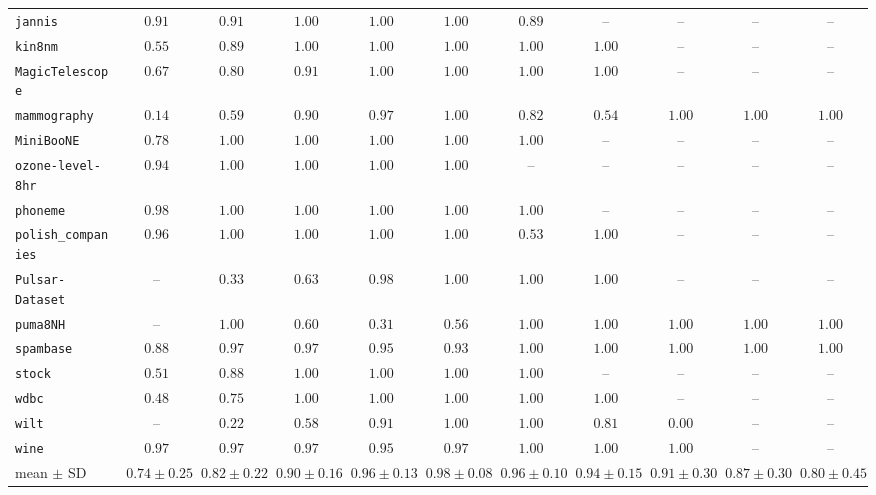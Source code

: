{\begin{tabular}{@{}lcccccccccc@{}}
\texttt{jannis} & $0.91$ & $0.91$ & $1.00$ & $1.00$ & $1.00$ & $0.89$ & -- & -- & -- & -- \\
\texttt{kin8nm} & $0.55$ & $0.89$ & $1.00$ & $1.00$ & $1.00$ & $1.00$ & $1.00$ & -- & -- & -- \\
\texttt{MagicTelescope} & $0.67$ & $0.80$ & $0.91$ & $1.00$ & $1.00$ & $1.00$ & $1.00$ & -- & -- & -- \\
\texttt{mammography} & $0.14$ & $0.59$ & $0.90$ & $0.97$ & $1.00$ & $0.82$ & $0.54$ & $1.00$ & $1.00$ & $1.00$ \\
\texttt{MiniBooNE} & $0.78$ & $1.00$ & $1.00$ & $1.00$ & $1.00$ & $1.00$ & -- & -- & -- & -- \\
\texttt{ozone-level-8hr} & $0.94$ & $1.00$ & $1.00$ & $1.00$ & $1.00$ & -- & -- & -- & -- & -- \\
\texttt{phoneme} & $0.98$ & $1.00$ & $1.00$ & $1.00$ & $1.00$ & $1.00$ & -- & -- & -- & -- \\
\texttt{polish\_companies} & $0.96$ & $1.00$ & $1.00$ & $1.00$ & $1.00$ & $0.53$ & $1.00$ & -- & -- & -- \\
\texttt{Pulsar-Dataset} & -- & $0.33$ & $0.63$ & $0.98$ & $1.00$ & $1.00$ & $1.00$ & -- & -- & -- \\
\texttt{puma8NH} & -- & $1.00$ & $0.60$ & $0.31$ & $0.56$ & $1.00$ & $1.00$ & $1.00$ & $1.00$ & $1.00$ \\
\texttt{spambase} & $0.88$ & $0.97$ & $0.97$ & $0.95$ & $0.93$ & $1.00$ & $1.00$ & $1.00$ & $1.00$ & $1.00$ \\
\texttt{stock} & $0.51$ & $0.88$ & $1.00$ & $1.00$ & $1.00$ & $1.00$ & -- & -- & -- & -- \\
\texttt{wdbc} & $0.48$ & $0.75$ & $1.00$ & $1.00$ & $1.00$ & $1.00$ & $1.00$ & -- & -- & -- \\
\texttt{wilt} & -- & $0.22$ & $0.58$ & $0.91$ & $1.00$ & $1.00$ & $0.81$ & $0.00$ & -- & -- \\
\texttt{wine} & $0.97$ & $0.97$ & $0.97$ & $0.95$ & $0.97$ & $1.00$ & $1.00$ & $1.00$ & -- & -- \\
\midrule mean $\pm$ SD & $0.74 \pm 0.25$ & $0.82 \pm 0.22$ & $0.90 \pm 0.16$ & $0.96 \pm 0.13$ & $0.98 \pm 0.08$ & $0.96 \pm 0.10$ & $0.94 \pm 0.15$ & $0.91 \pm 0.30$ & $0.87 \pm 0.30$ & $0.80 \pm 0.45$ \\
\bottomrule\end{tabular}}
